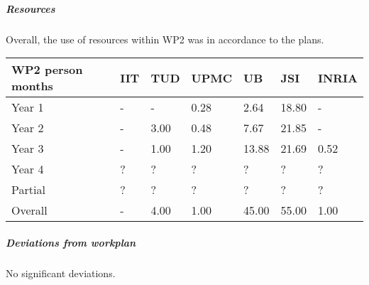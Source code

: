 \subparagraph*{Resources}
Overall, the use of resources within WP2 was in accordance to the plans. 

\begin{center}
\begin{tabular}{|C{1.5cm}|C{1.5cm}|C{1.5cm}|C{2cm}|C{2cm}|C{2cm}|C{2cm}|}
\hline
\footnotesize \textbf{WP2 person months}& \footnotesize \textbf{IIT}&\footnotesize \textbf{TUD}&\footnotesize \textbf{UPMC}& \footnotesize \textbf{UB} &\footnotesize \textbf{JSI} & \footnotesize \textbf{INRIA} \\ \hline
\footnotesize Year 1  &  -     & -    & 0.28 & 2.64  & 18.80  & -  \\  \hline
\footnotesize Year 2  &  -     & 3.00 & 0.48 & 7.67  & 21.85  & -  \\  \hline
\footnotesize Year 3  &  -     & 1.00 & 1.20 & 13.88 & 21.69  & 0.52  \\ \hline
\footnotesize Year 4  & ?     & ?    & ?    & ?    & ?    & ?    \\ \hline 
\footnotesize Partial & ?     & ?    & ?    & ?    & ?    & ?    \\
\hline \hline
\footnotesize Overall & -     & 4.00 & 1.00 & 45.00 & 55.00 & 1.00 \\ \hline
\end{tabular}
\end{center}

\subparagraph*{Deviations from workplan} 
No significant deviations.